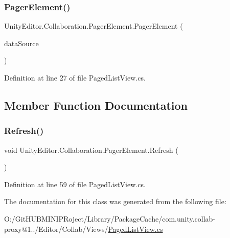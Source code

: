 \subsubsection{\texorpdfstring{PagerElement()}{PagerElement()}}
{\footnotesize\ttfamily Unity\+Editor.\+Collaboration.\+Pager\+Element.\+Pager\+Element (\begin{DoxyParamCaption}\item[{\mbox{\hyperlink{interface_unity_editor_1_1_collaboration_1_1_i_pager_data}{I\+Pager\+Data}}}]{data\+Source }\end{DoxyParamCaption})}



Definition at line 27 of file Paged\+List\+View.\+cs.



\subsection{Member Function Documentation}
\mbox{\label{class_unity_editor_1_1_collaboration_1_1_pager_element_ab4fc6ec40f8765378abab836cd4c03f9}} 
\subsubsection{\texorpdfstring{Refresh()}{Refresh()}}
{\footnotesize\ttfamily void Unity\+Editor.\+Collaboration.\+Pager\+Element.\+Refresh (\begin{DoxyParamCaption}{ }\end{DoxyParamCaption})}



Definition at line 59 of file Paged\+List\+View.\+cs.



The documentation for this class was generated from the following file\+:\begin{DoxyCompactItemize}
\item 
O\+:/\+Git\+H\+U\+B\+M\+I\+N\+I\+P\+Roject/\+Library/\+Package\+Cache/com.\+unity.\+collab-\/proxy@1../\+Editor/\+Collab/\+Views/\mbox{\hyperlink{_paged_list_view_8cs}{Paged\+List\+View.\+cs}}\end{DoxyCompactItemize}
